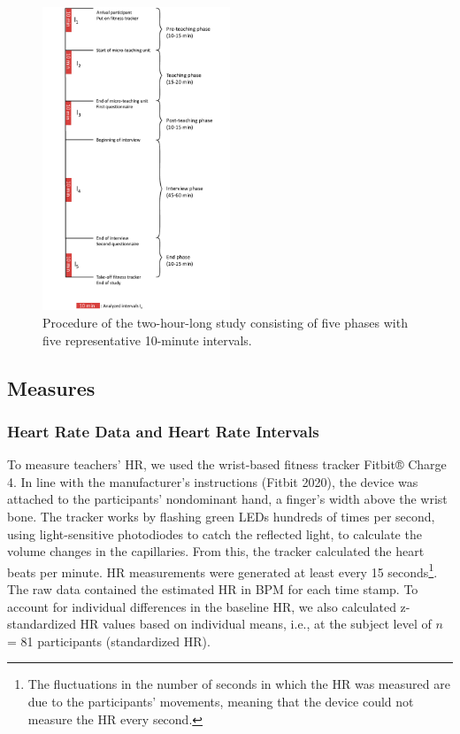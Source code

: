 \documentclass[preprint,
3p]{elsarticle} %
\begin{document}
\begin{figure}
  \centering
  \includegraphics[width=0.5\textwidth]{images/Timeline_smaller.pdf}
  \caption{Procedure of the two-hour-long study consisting of five phases with five representative 10-minute intervals.}
  \label{fig.2}
\end{figure}

\subsection{Measures}\label{measures}

\subsubsection{Heart Rate Data and Heart Rate
Intervals}\label{heart-rate-data-and-heart-rate-intervals}

To measure teachers' HR, we used the wrist-based fitness tracker Fitbit®
Charge 4. In line with the manufacturer's instructions (Fitbit 2020),
the device was attached to the participants' nondominant hand, a
finger's width above the wrist bone. The tracker works by flashing green
LEDs hundreds of times per second, using light-sensitive photodiodes to
catch the reflected light, to calculate the volume changes in the
capillaries. From this, the tracker calculated the heart beats per
minute. HR measurements were generated at least every 15
seconds\footnote{The fluctuations in the number of seconds in which the
  HR was measured are due to the participants' movements, meaning that
  the device could not measure the HR every second.}. The raw data
contained the estimated HR in BPM for each time stamp. To account for
individual differences in the baseline HR, we also calculated
z-standardized HR values based on individual means, i.e., at the subject
level of \(n\) = 81 participants (standardized HR).
\end{document}
